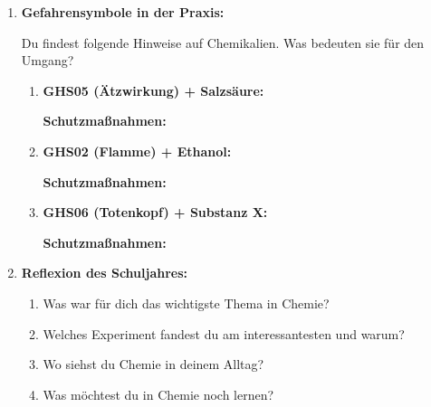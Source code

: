 \begin{enumerate}[label=\arabic*.]
    \vspace{1cm}

    \item \textbf{Gefahrensymbole in der Praxis:}
    \vspace{0.5cm}

    Du findest folgende Hinweise auf Chemikalien. Was bedeuten sie für den Umgang?

    \begin{enumerate}[label=\alph*)]
        \item \textbf{GHS05 (Ätzwirkung) + Salzsäure:}
        \vspace{1cm}

        \textbf{Schutzmaßnahmen:} \underline{\hspace{6cm}}

        \item \textbf{GHS02 (Flamme) + Ethanol:}
        \vspace{1cm}

        \textbf{Schutzmaßnahmen:} \underline{\hspace{6cm}}

        \item \textbf{GHS06 (Totenkopf) + Substanz X:}
        \vspace{1cm}

        \textbf{Schutzmaßnahmen:} \underline{\hspace{6cm}}
    \end{enumerate}

    \vspace{1cm}

    \item \textbf{Reflexion des Schuljahres:}
    \vspace{0.5cm}

    \begin{enumerate}[label=\alph*)]
        \item Was war für dich das wichtigste Thema in Chemie?
        \vspace{1.5cm}

        \item Welches Experiment fandest du am interessantesten und warum?
        \vspace{1.5cm}

        \item Wo siehst du Chemie in deinem Alltag?
        \vspace{1.5cm}

        \item Was möchtest du in Chemie noch lernen?
        \vspace{1.5cm}
    \end{enumerate}

\end{enumerate}